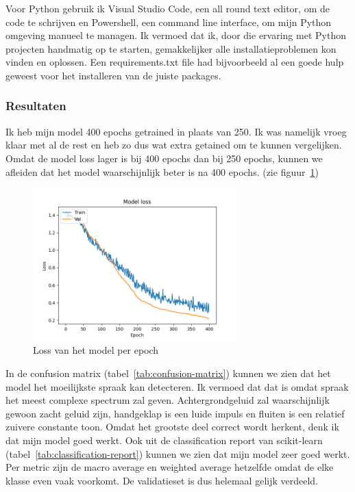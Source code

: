 Voor Python gebruik ik Visual Studio Code, een all round text editor, om de code te schrijven en Powershell, een command line interface, om mijn Python omgeving manueel te managen. Ik vermoed dat ik, door die ervaring met Python projecten handmatig op te starten, gemakkelijker alle installatieproblemen kon vinden en oplossen.
Een requirements.txt file \cite{pip-user-guide} had bijvoorbeeld al een goede hulp geweest voor het installeren van de juiste packages.

\subsubsection{Resultaten}
Ik heb mijn model 400 epochs getrained in plaats van 250. Ik was namelijk vroeg klaar met al de rest en heb zo dus wat extra getained om te kunnen vergelijken. Omdat de model loss lager is bij 400 epochs dan bij 250 epochs, kunnen we afleiden dat het model waarschijnlijk beter is na 400 epochs. (zie figuur~\ref{fig:cnn-training})

\begin{figure}[ht]
	\centering
	\includegraphics[width=0.7\textwidth]{figuren/cnn_model.png}
	\caption{Loss van het model per epoch}
	\label{fig:cnn-training}
\end{figure}

\newpage

In de confusion matrix (tabel~\ref{tab:confusion-matrix}) kunnen we zien dat het model het moeilijkste spraak kan detecteren.
Ik vermoed dat dat is omdat spraak het meest complexe spectrum zal geven. Achtergrondgeluid zal waarschijnlijk gewoon zacht geluid zijn, handgeklap is een luide impuls en fluiten is een relatief zuivere constante toon. Omdat het grootste deel correct wordt herkent, denk ik dat mijn model goed werkt. Ook uit de classification report van scikit-learn (tabel~\ref{tab:classification-report}) kunnen we zien dat mijn model zeer goed werkt.
Per metric zijn de macro average en weighted average hetzelfde omdat de elke klasse even vaak voorkomt. De validatieset is dus helemaal gelijk verdeeld.

